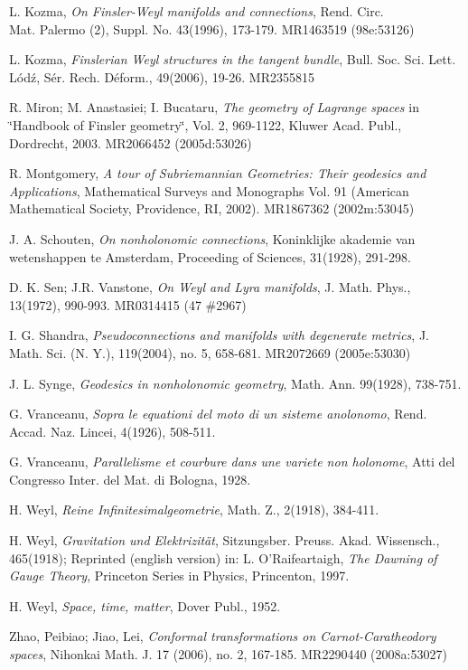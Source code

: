 \documentclass[11pt,oneside,english]{amsart}
\numberwithin{equation}{section}
\numberwithin{figure}{section}
\theoremstyle{plain}
\theoremstyle{definition}
\theoremstyle{definition}
\theoremstyle{plain}
\theoremstyle{plain}
\theoremstyle{remark}
\theoremstyle{remark}
\begin{document}
\begin{thebibliography}{10}
 L. Kozma, \textit{On Finsler-Weyl manifolds and
connections}, Rend. Circ. \\
 Mat. Palermo (2), Suppl. No. 43(1996), 173-179. MR1463519 (98e:53126)

 L. Kozma, \textit{Finslerian Weyl structures in
the tangent bundle}, Bull. Soc. Sci. Lett. Lód\'{z}, Sér. Rech. Déform.,
49(2006), 19-26. MR2355815

 R. Miron; M. Anastasiei; I. Bucataru, \textit{The
geometry of Lagrange spaces} in \char`\"{}Handbook of Finsler geometry\char`\"{},
Vol. 2, 969-1122, Kluwer Acad. Publ., Dordrecht, 2003. MR2066452 (2005d:53026)

 R. Montgomery, \emph{A tour of Subriemannian Geometries:
Their geodesics and Applications}, Mathematical Surveys and Monographs
Vol. 91 (American Mathematical Society, Providence, RI, 2002). MR1867362
(2002m:53045)

 J. A. Schouten, \emph{On nonholonomic connections},
Koninklijke akademie van wetenshappen te Amsterdam, Proceeding of
Sciences, 31(1928), 291-298.

 D. K. Sen; J.R. Vanstone, \textit{On Weyl and Lyra
manifolds}, J. Math. Phys., 13(1972), 990-993. MR0314415 (47 \#2967)

 I. G. Shandra, \textit{Pseudoconnections and manifolds
with degenerate metrics}, J. Math. Sci. (N. Y.), 119(2004), no. 5,
658-681. MR2072669 (2005e:53030)

 J. L. Synge, \emph{Geodesics in nonholonomic geometry},
Math. Ann. 99(1928), 738-751.

 G. Vranceanu,\emph{ Sopra le equationi del moto
di un sisteme anolonomo}, Rend. Accad. Naz. Lincei, 4(1926), 508-511.

 G. Vranceanu, \emph{Parallelisme et courbure dans
une variete non holonome}, Atti del Congresso Inter. del Mat. di Bologna,
1928.

 H. Weyl, \textit{Reine Infinitesimalgeometrie},
Math. Z., 2(1918), 384-411.

 H. Weyl, \textit{Gravitation und Elektrizität},
Sitzungsber. Preuss. Akad. Wissensch., 465(1918); Reprinted (english
version) in: L. O'Raifeartaigh, \textit{The Dawning of Gauge Theory},
Princeton Series in Physics, Princenton, 1997.

 H. Weyl, \textit{Space, time, matter}, Dover Publ.,
1952. 

 Zhao, Peibiao; Jiao, Lei, \emph{Conformal transformations
on Carnot-Caratheodory spaces}, Nihonkai Math. J. 17 (2006), no. 2,
167-185. MR2290440 (2008a:53027)

\end{thebibliography}
\vspace{0.3cm}
\end{document}
